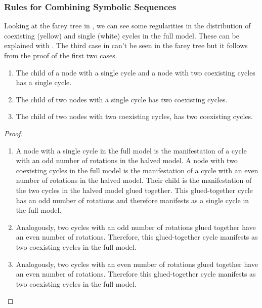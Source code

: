 \subsubsection{Rules for Combining Symbolic Sequences}

Looking at the farey tree in , we can see some regularities in the distribution of coexisting (yellow) and single (white) cycles in the full model.
These can be explained with .
The third case in  can't be seen in the farey tree but it follows from the proof of the first two cases.

\begin{theorem}
	\label{theorem:child.coexistence}
	\begin{enumerate}
		\item The child of a node with a single cycle and a node with two coexisting cycles has a single cycle.
		\item The child of two nodes with a single cycle has two coexisting cycles.
		\item The child of two nodes with two coexisting cycles, has two coexisting cycles.
	\end{enumerate}
\end{theorem}

\begin{proof} \phantom{x}
	\begin{enumerate}
		\item A node with a single cycle in the full model is the manifestation of a cycle with an odd number of rotations in the halved model.
		      A node with two coexisting cycles in the full model is the manifestation of a cycle with an even number of rotations in the halved model.
		      Their child is the manifestation of the two cycles in the halved model glued together.
		      This glued-together cycle has an odd number of rotations and therefore manifests as a single cycle in the full model.
		\item Analogously, two cycles with an odd number of rotations glued together have an even number of rotations.
		      Therefore, this glued-together cycle manifests as two coexisting cycles in the full model.
		\item Analogously, two cycles with an even number of rotations glued together have an even number of rotations.
		      Therefore this glued-together cycle manifests as two coexisting cycles in the full model.
	\end{enumerate}
\end{proof}

